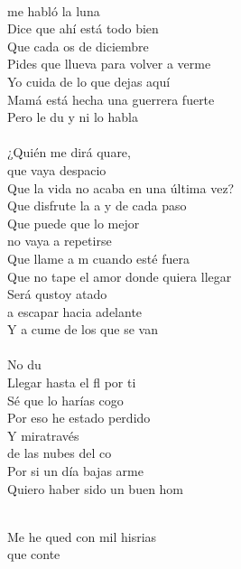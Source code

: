 \begin{cancion}[La orilla][Serko]%
	  \\
	 me habló la luna\\
Dice que ahí está todo bien\\
	Que cada os de diciembre\\
Pides que llueva para volver a verme\\
	Yo cuida de lo que dejas aquí\\
Mamá está hecha una guerrera fuerte\\
	Pero le du y ni lo habla\\
\jump\\
	¿Quién me dirá quare, \\
que vaya despacio\\
Que la vida no acaba en una última vez?\\
	Que disfrute la a y de cada paso\\
Que puede que lo mejor \\
no vaya a repetirse\\
	Que llame a m cuando esté fuera \\
Que no tape el amor donde quiera llegar\\
	Será qustoy atado \\
a escapar hacia adelante\\
	Y a cume de los que se van\\
\jump\\
	No du\\
	Llegar hasta el fl por ti\\
	Sé que lo harías cogo\\
Por eso he estado perdido\\
	Y miratravés \\
	de las nubes del co\\
	Por si un día bajas arme\\
	Quiero haber sido un buen hom\\\jump\\
	\begin{chorus}%
	Me he qued con mil hisrias \\
	que conte\\

\end{chorus}
\end{cancion}
